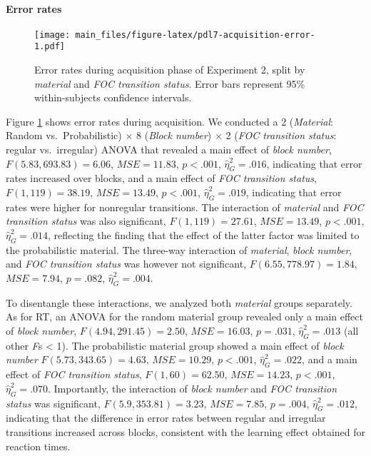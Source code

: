 \documentclass[floatsintext,doc]{apa6}
\theoremstyle{definition}
\theoremstyle{definition}
\theoremstyle{definition}
\theoremstyle{remark}
\begin{document}
\paragraph{Error rates}\label{error-rates-1}

\begin{figure}
\centering
\texttt{[image: main\_files/figure-latex/pdl7-acquisition-error-1.pdf]}
\caption{\label{fig:pdl7-acquisition-error}Error rates during acquisition
phase of Experiment 2, split by \emph{material} and \emph{FOC transition
status}. Error bars represent 95\% within-subjects confidence
intervals.}
\end{figure}

Figure \ref{fig:pdl7-acquisition-error} shows error rates during
acquisition. We conducted a 2 (\emph{Material}: Random
vs.~Probabilistic) \(\times\) 8 (\emph{Block number}) \(\times\) 2
(\emph{FOC transition status}: regular vs.~irregular) ANOVA that
revealed a main effect of \emph{block number},
\(F(5.83, 693.83) = 6.06\), \(\mathit{MSE} = 11.83\), \(p < .001\),
\(\hat{\eta}^2_G = .016\), indicating that error rates increased over
blocks, and a main effect of \emph{FOC transition status},
\(F(1, 119) = 38.19\), \(\mathit{MSE} = 13.49\), \(p < .001\),
\(\hat{\eta}^2_G = .019\), indicating that error rates were higher for
nonregular transitions. The interaction of \emph{material} and \emph{FOC
transition status} was also significant, \(F(1, 119) = 27.61\),
\(\mathit{MSE} = 13.49\), \(p < .001\), \(\hat{\eta}^2_G = .014\),
reflecting the finding that the effect of the latter factor was limited
to the probabilistic material. The three-way interaction of
\emph{material}, \emph{block number}, and \emph{FOC transition status}
was however not significant, \(F(6.55, 778.97) = 1.84\),
\(\mathit{MSE} = 7.94\), \(p = .082\), \(\hat{\eta}^2_G = .004\).

To disentangle these interactions, we analyzed both \emph{material}
groups separately. As for RT, an ANOVA for the random material group
revealed only a main effect of \emph{block number},
\(F(4.94, 291.45) = 2.50\), \(\mathit{MSE} = 16.03\), \(p = .031\),
\(\hat{\eta}^2_G = .013\) (all other \emph{F}s \textless{} 1). The
probabilistic material group showed a main effect of \emph{block number}
\(F(5.73, 343.65) = 4.63\), \(\mathit{MSE} = 10.29\), \(p < .001\),
\(\hat{\eta}^2_G = .022\), and a main effect of \emph{FOC transition
status}, \(F(1, 60) = 62.50\), \(\mathit{MSE} = 14.23\), \(p < .001\),
\(\hat{\eta}^2_G = .070\). Importantly, the interaction of \emph{block
number} and \emph{FOC transition status} was significant,
\(F(5.9, 353.81) = 3.23\), \(\mathit{MSE} = 7.85\), \(p = .004\),
\(\hat{\eta}^2_G = .012\), indicating that the difference in error rates
between regular and irregular transitions increased across blocks,
consistent with the learning effect obtained for reaction times.
\end{document}
